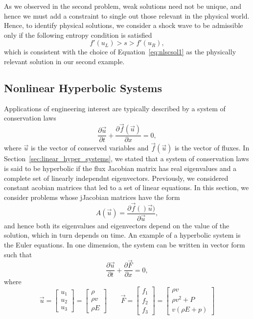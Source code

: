 As we observed in the second problem, weak solutions need not be unique, and hence we must add a constraint to single out those relevant in the physical world.  Hence, to identify physical solutions, we consider a shock wave to be admissible only if the following entropy condition is satisfied 
\begin{equation}
	f'(u_L) > s > f'(u_R),
\end{equation}
which is consistent with the choice of Equation~\ref{eq:nlscsol1} as the physically relevant solution in our second example.

\subsection{Nonlinear Hyperbolic Systems}
Applications of engineering interest are typically described by a system of conservation laws 
\begin{equation}
	\frac{\partial \vec u}{\partial t} + \frac{\partial \vec f (\vec u)}{\partial x} = 0,
\end{equation}
where $\vec u$ is the vector of conserved variables and $\vec f(\vec u)$ is the vector of fluxes. In Section~\ref{sec:linear_hyper_systems}, we stated that a system of conservation laws is said to be hyperbolic if the flux Jacobian matrix has real eigenvalues and a complete set of linearly independnt eigenvectors. Previously, we considered constant acobian matrices that led to a set of linear equations. In this section, we consider problems whose jJacobian matrices have the form 
\begin{equation}
	A(\vec u) = \frac{\partial \vec f()\vec u)}{\partial \vec u},
\end{equation}
and hence both its eigenvalues and eigenvectors depend on the value of the solution, which in turn depends on time. An example of a hyperbolic system is the Euler equations. In one dimension, the system can be written in vector form such that
\begin{equation}
	\frac{\partial \vec u}{\partial t} + \frac{\partial  \vec{F}}{\partial x} = 0,
\end{equation}
where
\begin{equation}
	\vec u = \begin{bmatrix}
		u_1 \\ u_2 \\ u_3
	\end{bmatrix}
	= 
	\begin{bmatrix}
		\rho \\ \rho v \\ \rho E
	\end{bmatrix}
	\quad\quad
	\vec F = 
	\begin{bmatrix}
		f_1 \\ f_2 \\ f_3
	\end{bmatrix}
	= 
	\begin{bmatrix}
		\rho v \\ \rho v^2 + P \\ v(\rho E + p)
	\end{bmatrix}
\end{equation}
